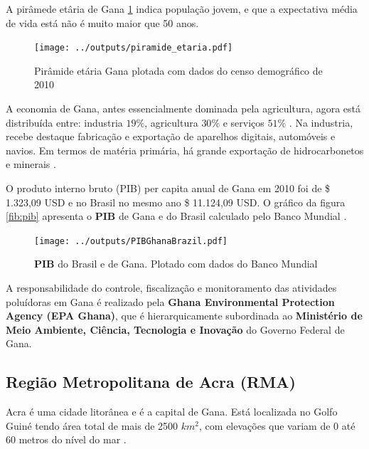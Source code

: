 A pirâmede etâria de Gana \ref{fig:piramedegana} indica população jovem, 
e que a expectativa média de vida está não é muito maior que 50 anos. 

\begin{figure}[H]
\begin{center}
  \texttt{[image: ../outputs/piramide\_etaria.pdf]}
  \caption{Pirâmide etária Gana plotada com dados do censo 
           demográfico de 2010 \citep{ghanacensus2013} \label{fig:piramedegana}}
\end{center}
\end{figure}

A economia de Gana, antes essencialmente dominada pela agricultura, 
agora está distribuída entre: industria $19\%$, agricultura $30\%$ 
e serviços $51\%$ \citep{ghanacensus2013}.
Na industria, recebe destaque fabricação e exportação de aparelhos digitais, 
automóveis e navios. Em termos de matéria primária, há grande exportação de 
hidrocarbonetos e minerais \citep{ghanacensus2013}.

O produto interno bruto (PIB) per capita anual de Gana em 2010 foi
de \$ 1.323,09 USD e no Brasil no mesmo ano \$ 11.124,09 USD.
O gráfico da figura \ref{fib:pib} apresenta o \textbf{PIB} de Gana e do Brasil 
calculado pelo Banco Mundial \citep{bancomundial}.

\begin{figure}[H]
\begin{center}
  \texttt{[image: ../outputs/PIBGhanaBrazil.pdf]}
  \caption{\textbf{PIB} do Brasil e de Gana. Plotado com dados do 
           Banco Mundial \citep{bancomundial} \label{fig:pib}}
\end{center}
\end{figure}

A responsabilidade do controle, fiscalização e monitoramento das 
atividades poluídoras em Gana é realizado pela 
\textbf{Ghana Environmental Protection Agency (EPA Ghana)}, que é 
hierarquicamente subordinada ao 
\textbf{Ministério de Meio Ambiente, Ciência, Tecnologia e Inovação} do 
Governo Federal de Gana.

\subsection{Região Metropolitana de Acra \textbf{(RMA)}}

Acra é uma cidade litorânea e é a capital de Gana. Está localizada 
no Golfo Guiné tendo área total de mais de 2500 $km^2$, com elevações que 
variam de 0 até 60 metros do nível do mar \citep{ARKU2008}.

